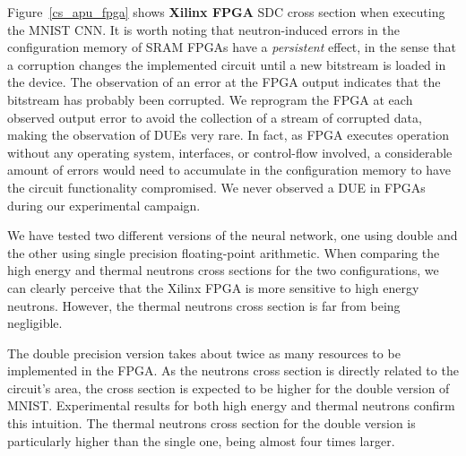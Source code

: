 Figure~\ref{cs_apu_fpga} shows \textbf{Xilinx FPGA} SDC cross section when executing the MNIST CNN. It is worth noting that neutron-induced errors in the configuration memory of SRAM FPGAs have a \textit{persistent} effect, in the sense that a corruption changes the implemented circuit until a new bitstream is loaded in the device. The observation of an error at the FPGA output indicates that the bitstream has probably been corrupted. 
We reprogram the FPGA at each observed output error to avoid the collection of a stream of corrupted data, making the observation of DUEs very rare. In fact, as FPGA executes operation without any operating system, interfaces, or control-flow involved, a considerable amount of errors would need to accumulate in the configuration memory to have the circuit functionality compromised. We never observed a DUE in FPGAs during our experimental campaign.

We have tested two different versions of the neural network, one using double and the other using single precision floating-point arithmetic. When comparing the high energy and thermal neutrons cross sections for the two configurations, we can clearly perceive that the Xilinx FPGA is more sensitive to high energy neutrons. However, the thermal neutrons cross section is far from being negligible.

The double precision version takes about twice as many resources to be implemented in the FPGA. As the neutrons cross section is directly related to the circuit's area, the cross section is expected to be higher for the double version of MNIST. Experimental results for both high energy and thermal neutrons confirm this intuition. The thermal neutrons cross section for the double version is particularly higher than the single one, being almost four times larger.

